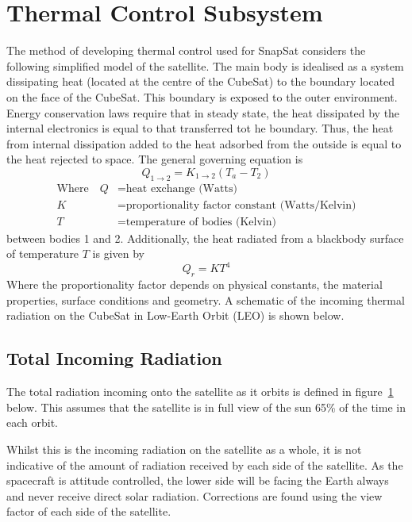 \section{Thermal Control Subsystem}
The method of developing thermal control used for SnapSat considers the following simplified model of the satellite. The main body is idealised as a system dissipating heat (located at the centre of the CubeSat) to the boundary located on the face of the CubeSat. This boundary is exposed to the outer environment. Energy conservation laws require that in steady state, the heat dissipated by the internal electronics is equal to that transferred tot he boundary. Thus, the heat from internal dissipation added to the heat adsorbed from the outside is equal to the heat rejected to space. The general governing equation is
\begin{equation}
    Q_{1\rightarrow2} = K_{1\rightarrow2}(T_a - T_2)
    \label{eqn:Qconduction}
\end{equation}  
\noindent
\begin{align}
    \text{Where}\quad Q &= \text{heat exchange (Watts)} \nonumber\\
    K &= \text{proportionality factor constant (Watts/Kelvin)} \nonumber\\
    T &= \text{temperature of bodies (Kelvin)} \nonumber
\end{align}
\noindent
between bodies 1 and 2. Additionally, the heat radiated from a blackbody surface of temperature $T$ is given by 
\begin{equation}
    Q_r = KT^4
    \label{eqn:Qradiation}
\end{equation} 
\noindent
Where the proportionality factor depends on physical constants, the material properties, surface conditions and geometry. A schematic of the incoming thermal radiation on the CubeSat in Low-Earth Orbit (LEO) is shown below.
\begin{figure}[H]
\end{figure}
\noindent

\subsection{Total Incoming Radiation}
The total radiation incoming onto the satellite as it orbits is defined in figure~\ref{plot:incomingradiation} below. This assumes that the satellite is in full view of the sun 65\% of the time in each orbit.
\begin{figure}[H]
    \label{plot:incomingradiation}
\end{figure}
\noindent
Whilst this is the incoming radiation on the satellite as a whole, it is not indicative of the amount of radiation received by each side of the satellite. As the spacecraft is attitude controlled, the lower side will be facing the Earth always and never receive direct solar radiation. Corrections are found using the view factor of each side of the satellite.

